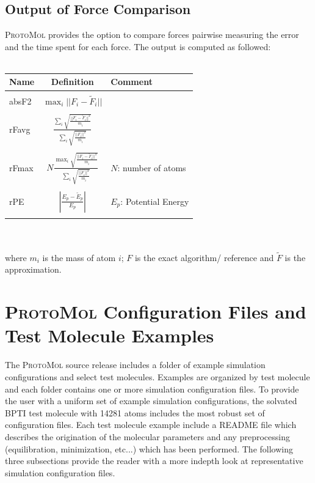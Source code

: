 \documentclass[11pt]{report}
\newcommand{\ProtoMol}{\textsc{ProtoMol }}
\begin{document}
\section{Output of Force Comparison}

\ProtoMol provides the option to compare forces pairwise measuring the
error and the time spent for each force. The output is computed as
followed:
\\
\\
\begin{tabular}{lcl}
\hline
    Name   & Definition  & Comment  \\\hline\\
    absF2  & \begin{math}\max_i || F_i - \tilde{F}_i || \end{math}&  \\ \\
    rFavg  & \begin{math}\frac{\sum_i \sqrt{\frac{|| F_i - \tilde{F}_i ||^2}{m_i}}}{\sum_i \sqrt{\frac{|| F_i ||^2}{m_i}}}\end{math} &  \\ \\
    rFmax  & \begin{math}N \frac{\max_i \sqrt{\frac{|| F_i -
    \tilde{F}_i ||^2}{m_i}}}{\sum_i \sqrt{\frac{|| F_i
    ||^2}{m_i}}}\end{math} & $N$: number of atoms\\ \\
    rPE    & \begin{math}\left|\frac{E_p - \tilde{E}_p}{E_p}\right|\end{math} & $E_p$: Potential Energy\\ \\\hline
\end{tabular}\\
\\
where $m_i$ is the mass of atom $i$; $F$ is the exact algorithm/ reference and $\tilde{F}$ is the approximation.
\chapter{\ProtoMol Configuration Files and Test Molecule Examples}


The \ProtoMol source release includes a folder of example simulation
configurations and select test molecules. Examples are organized by
test molecule and each folder contains one or more simulation configuration files. To provide the user with a uniform
set of example simulation configurations, the solvated BPTI test
molecule with 14281 atoms includes the most robust set of
configuration files. Each test molecule example include a README file
which describes the origination of the molecular parameters and any
preprocessing (equilibration, minimization, etc...) which has been
performed.  The following three subsections provide the reader with a
more indepth look at representative simulation configuration files.
\end{document}
